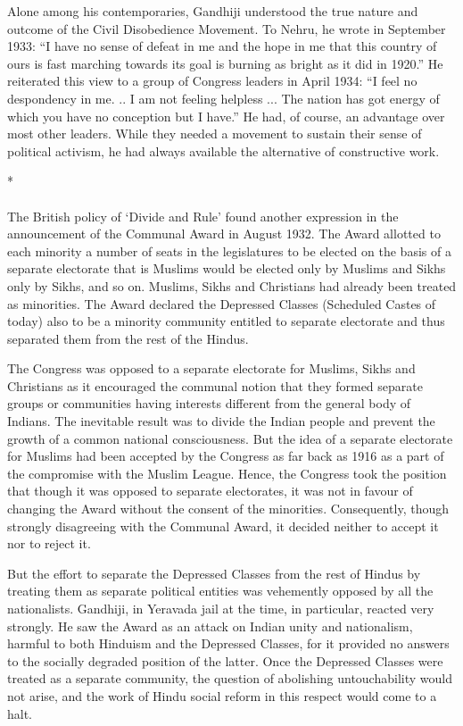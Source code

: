 \begin{multicols}{2}
Alone among his contemporaries, Gandhiji understood the true nature and outcome of the Civil Disobedience Movement. To Nehru, he wrote in September 1933: ``I have no sense of defeat in me and the hope in me that this country of ours is fast marching towards its goal is burning as bright as it did in 1920.'' He reiterated this view to a group of Congress leaders in April 1934: ``I feel no despondency in me. .. I am not feeling helpless ... The nation has got energy of which you have no conception but I have.'' He had, of course, an advantage over most other leaders. While they needed a movement to sustain their sense of political activism, he had always available the alternative of constructive work.

\begin{center}*\end{center}

\paragraph*{}
The British policy of `Divide and Rule' found another expression in the announcement of the Communal Award in August 1932. The Award allotted to each minority a number of seats in the legislatures to be elected on the basis of a separate electorate that is Muslims would be elected only by Muslims and Sikhs only by Sikhs, and so on. Muslims, Sikhs and Christians had already been treated as minorities. The Award declared the Depressed Classes (Scheduled Castes of today) also to be a minority community entitled to separate electorate and thus separated them from the rest of the Hindus.

The Congress was opposed to a separate electorate for Muslims, Sikhs and Christians as it encouraged the communal notion that they formed separate groups or communities having interests different from the general body of Indians. The inevitable result was to divide the Indian people and prevent the growth of a common national consciousness. But the idea of a separate electorate for Muslims had been accepted by the Congress as far back as 1916 as a part of the compromise with the Muslim League. Hence, the Congress took the position that though it was opposed to separate electorates, it was not in favour of changing the Award without the consent of the minorities. Consequently, though strongly disagreeing with the Communal Award, it decided neither to accept it nor to reject it.

But the effort to separate the Depressed Classes from the rest of Hindus by treating them as separate political entities was vehemently opposed by all the nationalists. Gandhiji, in Yeravada jail at the time, in particular, reacted very strongly. He saw the Award as an attack on Indian unity and nationalism, harmful to both Hinduism and the Depressed Classes, for it provided no answers to the socially degraded position of the latter. Once the Depressed Classes were treated as a separate community, the question of abolishing untouchability would not arise, and the work of Hindu social reform in this respect would come to a halt.


\end{multicols}

